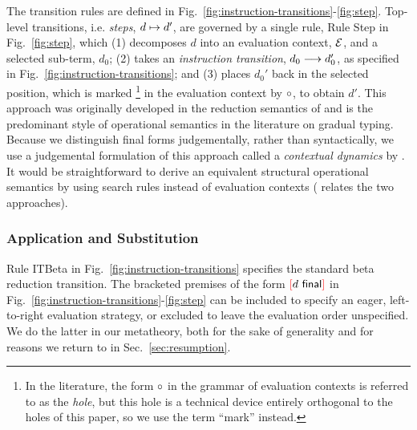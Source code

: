 

The transition rules are defined in Fig.~\ref{fig:instruction-transitions}-\ref{fig:step}. 
Top-level transitions, i.e. \emph{steps}, $d \mapsto d'$, are governed by a single rule, Rule {Step} in Fig.~\ref{fig:step}, which 
(1) decomposes $d$ into an evaluation context, $\mathcal{E}$, and a selected sub-term, $d_0$; 
(2) takes an \emph{instruction transition}, $d_0 \longrightarrow d_0'$, as specified in Fig.~\ref{fig:instruction-transitions}; 
and (3) places $d_0'$ back in the selected position, which is marked%
\footnote{In the literature, the form $\circ$ in the grammar of evaluation contexts is referred to as the \emph{hole}, but this hole is a technical device entirely orthogonal to the holes of this paper, so we use the term ``mark'' instead.} 
in the evaluation context by $\circ$, to obtain $d'$.
This approach was originally developed in the reduction semantics of \citet{DBLP:journals/tcs/FelleisenH92} and is the predominant style of operational semantics in the literature on gradual typing. 
Because we distinguish final forms judgementally, rather than syntactically, we use a judgemental formulation of this approach called a \emph{contextual dynamics} by \citet{pfpl}. 
It would be straightforward to derive an equivalent structural operational semantics \cite{DBLP:journals/jlp/Plotkin04a} by using search rules instead of evaluation contexts (\citet{pfpl} relates the two approaches).




\subsubsection{Application and Substitution} 
Rule {ITBeta} in Fig.~\ref{fig:instruction-transitions} specifies the standard beta reduction transition. 
The bracketed premises of the form ${\textcolor{red}[}d~\mathsf{final}{\textcolor{red}]}$ in Fig.~\ref{fig:instruction-transitions}-\ref{fig:step} can be included to specify an eager, left-to-right evaluation strategy, 
or excluded to leave the evaluation order unspecified. 
We do the latter in our metatheory, both for the sake of generality and for reasons we return to in Sec.~\ref{sec:resumption}.

